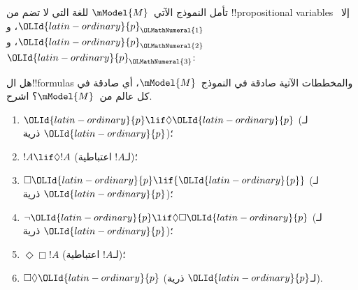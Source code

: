 \documentclass[../../../include/open-logic-section]{subfiles}
\begin{document}
\begin{prob}
  تأمل النموذج الآتي~$\mModel{M}$ للغة التي لا تضم من
  !!{propositional variable}s إلا~${\OLId{latin-ordinary}{p}}_{\OLMathNumeral{1}}$، و${\OLId{latin-ordinary}{p}}_{\OLMathNumeral{2}}$، و${\OLId{latin-ordinary}{p}}_{\OLMathNumeral{3}}$:
  \begin{center}
  \end{center}
  هل ال!!{formula}s والمخططات الآتية صادقة في النموذج~$\mModel{M}$،
  أي صادقة في كل عالم من~$\mModel{M}$؟ اشرح.
  \begin{enumerate}
  \item ${\OLId{latin-ordinary}{p}}\lif \Diamond {\OLId{latin-ordinary}{p}}$ (لـ${\OLId{latin-ordinary}{p}}$ ذرية)؛
  \item $!A\lif \Diamond !A$ (لـ$!A$ اعتباطية)؛
  \item $\Box {\OLId{latin-ordinary}{p}} \lif {\OLId{latin-ordinary}{p}}$ (لـ${\OLId{latin-ordinary}{p}}$ ذرية)؛
  \item $\lnot {\OLId{latin-ordinary}{p}} \lif \Diamond \Box {\OLId{latin-ordinary}{p}}$ (لـ${\OLId{latin-ordinary}{p}}$ ذرية)؛
  \item $\Diamond \Box !A$ (لـ$!A$ اعتباطية)؛
  \item $\Box \Diamond {\OLId{latin-ordinary}{p}}$ (لـ${\OLId{latin-ordinary}{p}}$ ذرية).
  \end{enumerate}
\end{prob}
\end{document}
